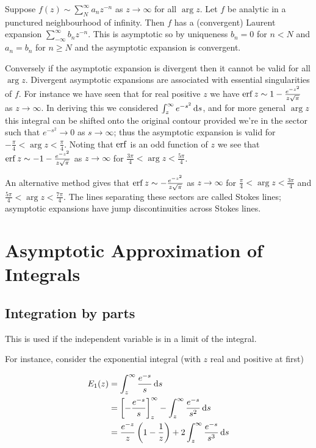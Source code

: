 \documentclass{notes}
\theoremstyle{plain}
\begin{document}
Suppose $f(z) \sim \sum_N^\infty a_n z^{-n}$ as $z \to \infty$ for all
$\arg z$.  Let $f$ be analytic in a punctured neighbourhood of
infinity.  Then $f$ has a (convergent) Laurent expansion
$\sum_{-\infty}^\infty b_n z^{-n}$.  This is asymptotic so by
uniqueness $b_n = 0$ for $n < N$ and $a_n = b_n$ for $n \ge N$ and the
asymptotic expansion is convergent.

Conversely if the asymptotic expansion is divergent then it cannot be
valid for all $\arg z$.  Divergent asymptotic expansions are associated with
essential singularities of $f$.  For instance we have seen that
for real positive $z$ we have
$\operatorname{erf} z \sim 1 - \frac{e^{-z^2}}{z \sqrt{\pi}}$ as $z \to \infty$.  In
deriving this we considered $\int_z^\infty e^{-s^2}\, \mathrm{d} s$, and for
more general $\arg z$ this integral can be shifted onto the original
contour provided we're in the sector such that $e^{-s^2} \to 0$ as
$s \to \infty$; thus the asymptotic expansion is valid for
$-\tfrac{\pi}{4} < \arg z < \tfrac{\pi}{4}$.  Noting that
$\operatorname{erf}$ is an odd function of $z$ we see that
$\operatorname{erf} z \sim -1 - \frac{e^{-z^2}}{z \sqrt{\pi}}$ as $z \to \infty$
for $\tfrac{3\pi}{4} < \arg z < \tfrac{5 \pi}{4}$.

An alternative method gives that $\operatorname{erf} z \sim - \frac{e^{-z^2}}{z \sqrt{\pi}}$
as $z \to \infty$ for $\tfrac{\pi}{4} < \arg z < \tfrac{3 \pi}{4}$
and $\tfrac{5\pi}{4} < \arg z < \tfrac{7 \pi}{4}$.  The lines separating
these sectors are called Stokes lines; asymptotic expansions have
jump discontinuities across Stokes lines.

\section{Asymptotic Approximation of Integrals}

\subsection{Integration by parts}

This is used if the independent variable is in a limit of the integral.

For instance, consider the exponential integral (with $z$ real and positive
at first)

\begin{align*}
E_1(z) &= \int_z^\infty \frac{e^{-s}}{s}\, \mathrm{d} s \\
&= \left[ - \frac{e^{-s}}{s} \right]_z^\infty - \int_z^\infty
\frac{e^{-s}}{s^2}\, \mathrm{d} s \\
&= \frac{e^{-z}}{z} \left( 1 - \frac{1}{z} \right)
+ 2 \int_z^\infty \frac{e^{-s}}{s^3}\, \mathrm{d} s
\end{align*}
\end{document}

